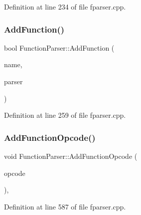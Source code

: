 Definition at line 234 of file fparser.\+cpp.

\mbox{\label{class_function_parser_a7d6c6465658e9831d0c51e3bd6b5a4c0}} 
\subsubsection{\texorpdfstring{Add\+Function()}{AddFunction()}\hspace{0.1cm}{\footnotesize\ttfamily [2/2]}}
{\footnotesize\ttfamily bool Function\+Parser\+::\+Add\+Function (\begin{DoxyParamCaption}\item[{const std\+::string \&}]{name,  }\item[{\hyperlink{class_function_parser}{Function\+Parser} \&}]{parser }\end{DoxyParamCaption})}



Definition at line 259 of file fparser.\+cpp.

\mbox{\label{class_function_parser_aadefd3517f92e066d9926a1998e9fe2f}} 
\subsubsection{\texorpdfstring{Add\+Function\+Opcode()}{AddFunctionOpcode()}}
{\footnotesize\ttfamily void Function\+Parser\+::\+Add\+Function\+Opcode (\begin{DoxyParamCaption}\item[{unsigned}]{opcode }\end{DoxyParamCaption})\hspace{0.3cm}{\ttfamily [inline]}, {\ttfamily [private]}}



Definition at line 587 of file fparser.\+cpp.

\mbox{\label{class_function_parser_a59cf4b93d74e0572386742603977f886}} 

